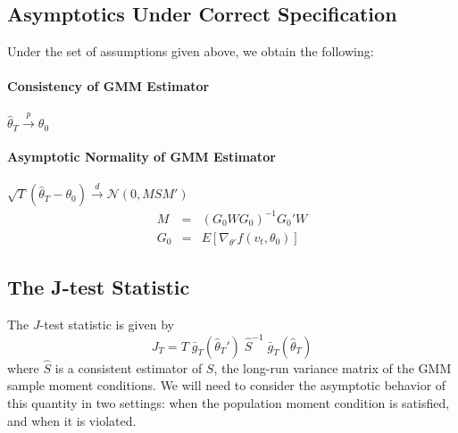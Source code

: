 \subsection{Asymptotics Under Correct Specification}
Under the set of assumptions given above, we obtain the following:

\paragraph{Consistency of GMM Estimator} $\widehat{\theta}_T \overset{p}{\rightarrow} \theta_0$

\paragraph{Asymptotic Normality of GMM Estimator}
$\sqrt{T} (\widehat{\theta}_T - \theta_0)\overset{d}{\rightarrow} \mathcal{N}(0,MSM')$
	\begin{eqnarray*}
		M &=& (G_0 W G_0)^{-1} G_0'W\\
		G_0 &=& E[\nabla_{\theta'} f(v_t, \theta_0)]
	\end{eqnarray*}


\subsection{The J-test Statistic}
The $J$-test statistic is given by
	$$J_T = T\; \bar{g}_T(\widehat{\theta}_T')\; \widehat{S}^{-1} \;\bar{g}_T(\widehat{\theta}_T)$$
where $\widehat{S}$ is a consistent estimator of $S$, the long-run variance matrix of the GMM sample moment conditions. We will need to consider the asymptotic behavior of this quantity in two settings: when the population moment condition is satisfied, and when it is violated.

